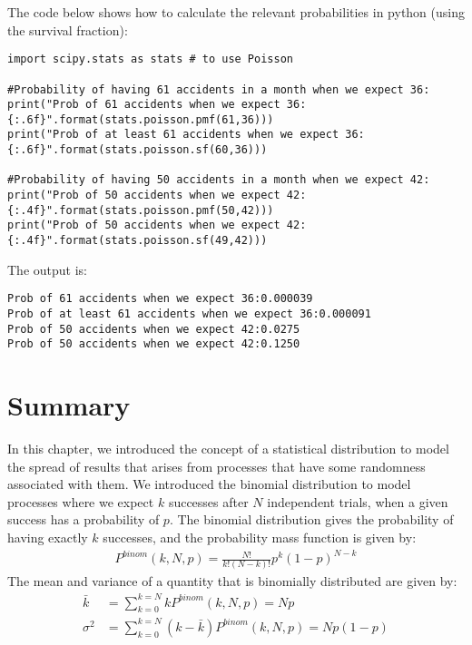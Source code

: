 \begin{example}{}
The code below shows how to calculate the relevant probabilities in python (using the survival fraction):
\begin{lstlisting}[frame=single] 
import scipy.stats as stats # to use Poisson

#Probability of having 61 accidents in a month when we expect 36:
print("Prob of 61 accidents when we expect 36:{:.6f}".format(stats.poisson.pmf(61,36)))
print("Prob of at least 61 accidents when we expect 36:{:.6f}".format(stats.poisson.sf(60,36)))

#Probability of having 50 accidents in a month when we expect 42:
print("Prob of 50 accidents when we expect 42:{:.4f}".format(stats.poisson.pmf(50,42)))
print("Prob of 50 accidents when we expect 42:{:.4f}".format(stats.poisson.sf(49,42)))
\end{lstlisting}
The output is:
\begin{verbatim}
Prob of 61 accidents when we expect 36:0.000039
Prob of at least 61 accidents when we expect 36:0.000091
Prob of 50 accidents when we expect 42:0.0275
Prob of 50 accidents when we expect 42:0.1250
\end{verbatim}
\end{example}


\section{Summary}
In this chapter, we introduced the concept of a statistical distribution to model the spread of results that arises from processes that have some randomness associated with them. We introduced the binomial distribution to model processes where we expect $k$ successes after $N$ independent trials, when a given success has a probability of $p$. The binomial distribution gives the probability of having exactly $k$ successes, and the probability mass function is given by:
\begin{align}
P^{binom}(k,N,p)=\frac{N!}{k!(N-k)!}p^k(1-p)^{N-k}
\end{align}
The mean and variance of a quantity that is binomially distributed are given by:
\begin{align}
\bar k &= \sum_{k=0}^{k=N}kP^{binom}(k,N,p)=Np\\
\sigma^2 &= \sum_{k=0}^{k=N}(k-\bar k)P^{binom}(k,N,p)=Np(1-p)
\end{align}

